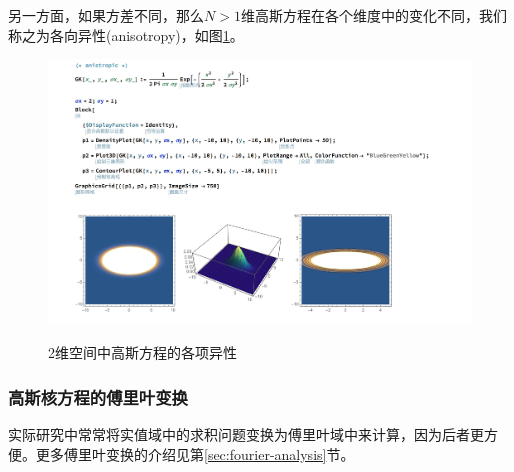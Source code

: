 \begin{subappendices}
另一方面，如果方差不同，那么$N>1$维高斯方程在各个维度中的变化不同，我们称之为各向异性(anisotropy)，如图\ref{fig:gaussian-anisotropy-2d}。
\begin{figure}[htbp]
  \caption{2维空间中高斯方程的各项异性}
  \centering
  \includegraphics[width=12cm]{./Figures/20180405-anisotropy}
  \label{fig:gaussian-anisotropy-2d}
%
\end{figure}

\subsubsection{高斯核方程的傅里叶变换}
\label{sec:gaussian-kernel-fourier}
实际研究中常常将实值域中的求积问题变换为傅里叶域中来计算，因为后者更方便。更多傅里叶变换的介绍见第\ref{sec:fourier-analysis}节。


\end{subappendices}
